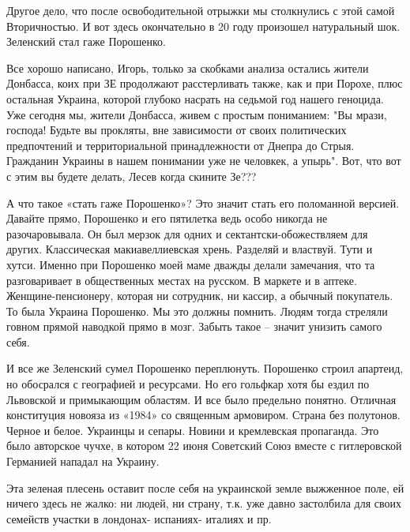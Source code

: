 Другое дело, что после освободительной отрыжки мы столкнулись с этой самой
Вторичностью. И вот здесь окончательно в 20 году произошел натуральный шок.
Зеленский стал гаже Порошенко.

\begin{cmtfront}

Все хорошо написано, Игорь, только за скобками анализа остались жители
Донбасса, коих при ЗЕ продолжают расстерливать также, как и при Порохе,
плюс остальная Украина, которой глубоко насрать на седьмой год нашего
геноцида. Уже сегодня мы, жители Донбасса, живем с простым пониманием:
"Вы мрази, господа! Будьте вы прокляты, вне зависимости от своих
политических предпочтений и территориальной принадлежности от Днепра до
Стрыя. Гражданин Украины в нашем понимании уже не человкек, а упырь".
Вот, что вот с этим вы будете делать, Лесев когда скините Зе???
	
\end{cmtfront}

А что такое «стать гаже Порошенко»? Это значит стать его поломанной версией.
Давайте прямо, Порошенко и его пятилетка ведь особо никогда не разочаровывала.
Он был мерзок для одних и сектантски-обожествляем для других. Классическая
макиавеллиевская хрень. Разделяй и властвуй. Тути и хутси. Именно при Порошенко
моей маме дважды делали замечания, что та разговаривает в общественных местах
на русском. В маркете и в аптеке. Женщине-пенсионеру, которая ни сотрудник, ни
кассир, а обычный покупатель. То была Украина Порошенко. Мы это должны помнить.
Людям тогда стреляли говном прямой наводкой прямо в мозг. Забыть такое – значит
унизить самого себя.

И все же Зеленский сумел Порошенко переплюнуть. Порошенко строил апартеид, но
обосрался с географией и ресурсами. Но его гольфкар хотя бы ездил по Львовской
и примыкающим областям. И все было предельно понятно. Отличная конституция
новояза из «1984» со священным армовиром. Страна без полутонов. Черное и белое.
Украинцы и сепары. Новини и кремлевская пропаганда. Это было авторское чучхе, в
котором 22 июня Советский Союз вместе с гитлеровской Германией нападал на
Украину.

\begin{cmtfront}

Эта зеленая плесень оставит после себя на украинской земле выжженное поле, ей
ничего здесь не жалко: ни людей, ни страну, т.к. уже давно застолбила
для своих семейств участки в лондонах- испаниях- италиях и пр.
	
\end{cmtfront}

